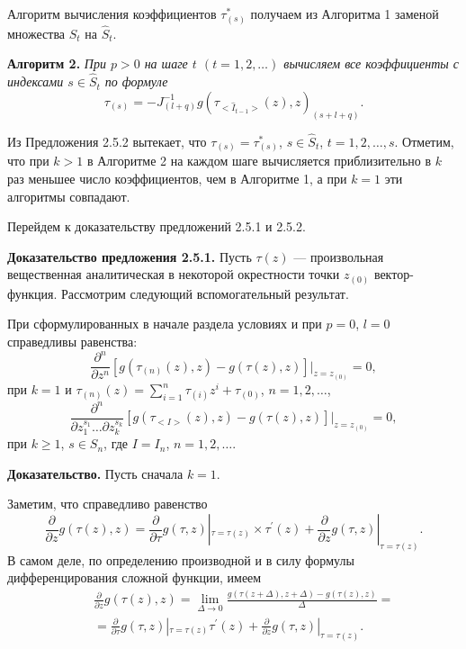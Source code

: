                         Алгоритм вычисления коэффициентов $\tau^*_{(s)}$ получаем из
                        Алгоритма 1 заменой множества $S_t$ на $\hat S_t$.


                        \textbf{ Алгоритм 2.} \textit{ При $p>0$ на шаге $t$ $(t=1,2,\ldots)$
                            вычисляем все коэффициенты с индексами $s\in\hat S_t$ по формуле
                                $$
                                \tau_{(s)}=-J^{-1}_{(l+q)} g\left(\tau_{<\hat
                                        I_{t-1}>}(z),z\right)_{(s+l+q)}.
                                $$
                        }

Из Предложения 2.5.2 вытекает, что $\tau_{(s)}=\tau^*_{(s)}$, $s\in
\hat S_t$, $t=1,2,\ldots,s$. Отметим, что при $k>1$ в Алгоритме 2 на
каждом шаге вычисляется приблизительно в $k$ раз меньшее число
коэффициентов, чем в Алгоритме 1, а при $k=1$ эти алгоритмы
совпадают.

Перейдем к доказательству предложений  2.5.1 и 2.5.2.

\textbf{ Доказательство предложения 2.5.1.} Пусть $\tau(z)$ ---
произвольная вещественная аналитическая в некоторой окрестности
точки $z_{(0)}$ вектор- функция. Рассмотрим следующий
вспомогательный результат.

\begin{lem}
 \label{th:ageom<cq}
 При сформулированных в начале раздела  условиях и при $p=0$, $l=0$
 справедливы равенства:
 $$
 \frac{\partial^n}{\partial z^n}\left[g\left(\tau_{(n)}(z),z\right)-
 g\left(\tau(z),z\right)\right]|_{z=z_{(0)}}=0,
 $$
 при $k=1$ и $\tau_{(n)}(z)=\sum^n_{i=1}\tau_{(i)}z^i+\tau_{(0)}$,
 $n=1,2,\ldots$,
 $$
 \frac{\partial^n}{\partial z^{s_1}_1\ldots\partial z^{s_k}_k} \left[
     g\left(\tau_{<I>}(z),z\right)-g\left(\tau(z),z\right)\right]|_{z=z_{(0)}}=0,
     $$
     при $k\geq 1$, $s\in S_n$, где $I=I_n$, $n=1,2,\ldots$.
     \end{lem}

     \textbf{ Доказательство.} Пусть сначала $k=1$.

     Заметим, что справедливо равенство
     $$
     \frac{\partial}{\partial z}
     g\left(\tau(z),z\right)=\frac{\partial}{\partial \tau}
     g(\tau,z)|_{\tau=\tau(z)} \times
     \tau^{'}(z)+\frac{\partial}{\partial z} g(\tau,z)|_{\tau=\tau(z)}.
     $$
     В самом деле, по определению производной и в силу формулы
     дифференцирования сложной функции, имеем \begin{align}
     &&\frac{\partial}{\partial z} g(\tau(z),z)=\lim_{\Delta\to 0}
     \frac{g(\tau(z+\Delta),z+\Delta)-g(\tau(z),z)}{\Delta} = \nonumber\\
         &&=\frac{\partial}{\partial \tau} g(\tau,z)|_{\tau=\tau(z)}
         \tau^{'}(z)+ \frac{\partial}{\partial z} g(\tau,z)|_{\tau=\tau(z)}.
         \nonumber \end{align}

